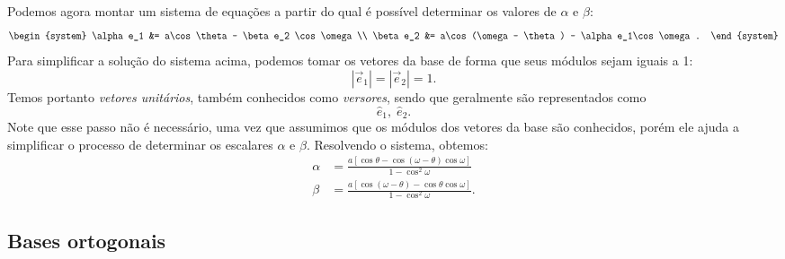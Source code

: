 Podemos agora montar um sistema de equações a partir do qual é possível determinar os valores de $\alpha$ e $\beta$:
\begin{equation}
\begin{system}
    \alpha e_1 &= a\cos\theta - \beta e_2 \cos\omega \\
    \beta e_2 &= a\cos(\omega - \theta) - \alpha e_1\cos\omega.
\end{system}
\end{equation}
%
Para simplificar a solução do sistema acima, podemos tomar os vetores da base de forma que seus módulos sejam iguais a 1:
\begin{equation}
    |\vec{e}_1| = |\vec{e}_2| = 1.
\end{equation}
%
Temos portanto \emph{vetores unitários}, também conhecidos como \emph{versores}, sendo que geralmente são representados como
\begin{displaymath}
    \hat{e}_1, \;\hat{e}_2.
\end{displaymath}
%
Note que esse passo não é necessário, uma vez que assumimos que os módulos dos vetores da base são conhecidos, porém ele ajuda a simplificar o processo de determinar os escalares $\alpha$ e $\beta$. Resolvendo o sistema, obtemos:
\begin{align}
    \alpha &= \frac{a[\cos\theta - \cos(\omega-\theta)\cos\omega]}{1-\cos^2\omega} \label{Eq:AlphaEBetaEmFuncaoDeAETheta1} \\
    \beta &= \frac{a[\cos(\omega - \theta) - \cos\theta\cos\omega]}{1-\cos^2\omega} \label{Eq:AlphaEBetaEmFuncaoDeAETheta2}.
\end{align}

\subsection{Bases ortogonais}\label{Sec:ComponentesVetoriais}

